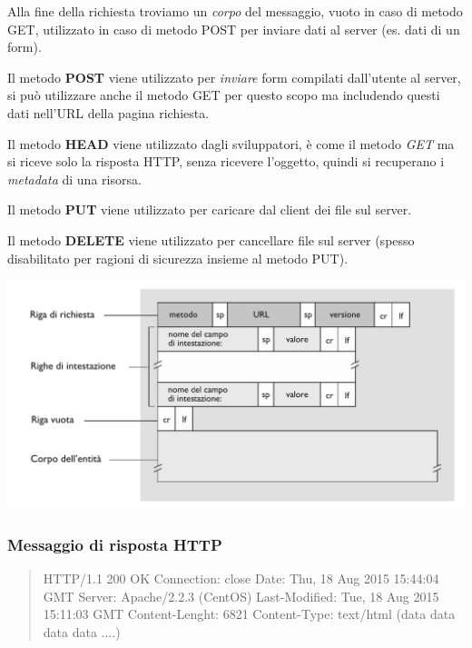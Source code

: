 Alla fine della richiesta troviamo un \textit{corpo} del messaggio, vuoto in caso di metodo GET, utilizzato in caso di metodo POST per inviare dati al server (es. dati di un form).

Il metodo \textbf{POST} viene utilizzato per \textit{inviare} form compilati dall'utente al server, si può utilizzare anche il metodo GET per questo scopo ma includendo questi dati nell'URL della pagina richiesta.

Il metodo \textbf{HEAD} viene utilizzato dagli sviluppatori, è come il metodo \textit{GET} ma si riceve solo la risposta HTTP, senza ricevere l'oggetto, quindi si recuperano i \textit{metadata} di una risorsa.

Il metodo \textbf{PUT} viene utilizzato per caricare dal client dei file sul server.

Il metodo \textbf{DELETE} viene utilizzato per cancellare file sul server (spesso disabilitato per ragioni di sicurezza insieme al metodo PUT).

\includegraphics[width=\textwidth]{./img/richiestaHTTP.png}

\subsubsection*{Messaggio di risposta HTTP}
\begin{quote}
  HTTP/1.1 200 OK
  Connection: close \newline
  Date: Thu, 18 Aug 2015 15:44:04 GMT \newline
  Server: Apache/2.2.3 (CentOS) \newline
  Last-Modified: Tue, 18 Aug 2015 15:11:03 GMT \newline
  Content-Lenght: 6821 \newline
  Content-Type: text/html \newline
  (data data data data ....)
\end{quote}


